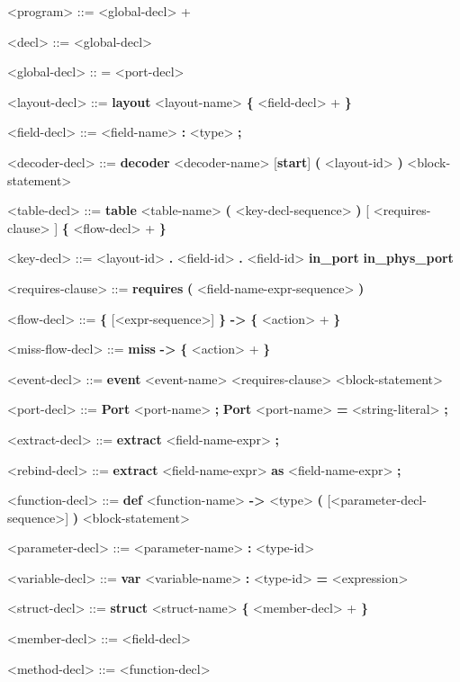 \begin{mdframed}
\begin{grammar}

<program> ::= <global-decl> +

<decl> ::=
<global-decl>

<global-decl> :: =
<port-decl>

<layout-decl> ::=
\textbf{layout} <layout-name> 
\textbf{\{}
	<field-decl> +
\textbf{\}}

<field-decl> ::=
<field-name> \textbf{:} <type> \textbf{;}

<decoder-decl> ::=
\textbf{decoder} <decoder-name> [\textbf{start}] 
\textbf{(} <layout-id> \textbf{)}
<block-statement>

<table-decl> ::=
\textbf{table} <table-name> \textbf{(} <key-decl-sequence> \textbf{)} 
[ <requires-clause> ]
\textbf{\{} 
<flow-decl> + 
\textbf{\}}

<key-decl> ::=
<layout-id> \textbf{.} <field-id>
 \textbf{.} <field-id>
\alt \textbf{in\_port}
\alt \textbf{in\_phys\_port}

<requires-clause> ::=
\textbf{requires} \textbf{(} <field-name-expr-sequence> \textbf{)}

<flow-decl> ::=
\textbf{\{} [<expr-sequence>] \textbf{\}} \textbf{-\textgreater}
\textbf{\{} 
<action> +
\textbf{\}}

<miss-flow-decl> ::=
\textbf{miss} \textbf{-\textgreater}
\textbf{\{} 
<action> +
\textbf{\}}

<event-decl> ::=
\textbf{event} <event-name> <requires-clause> 
<block-statement>

<port-decl> ::=
\textbf{Port} <port-name> \textbf{;}
\alt \textbf{Port} <port-name> \textbf{=} <string-literal> \textbf{;}

<extract-decl> ::=
\textbf{extract} <field-name-expr> \textbf{;}

<rebind-decl> ::=
\textbf{extract} <field-name-expr> \textbf{as} <field-name-expr> \textbf{;}

<function-decl> ::=
\textbf{def} <function-name> \textbf{-\textgreater} <type> 
\textbf{(} [<parameter-decl-sequence>] \textbf{)} <block-statement>

<parameter-decl> ::=
<parameter-name> \textbf{:} <type-id>

<variable-decl> ::=
\textbf{var} <variable-name> \textbf{:} <type-id> \textbf{=} <expression>

<struct-decl> ::=
\textbf{struct} <struct-name>
\textbf{\{}
	<member-decl> +
\textbf{\}}

<member-decl> ::=
<field-decl>

<method-decl> ::= <function-decl>


\end{grammar}
\end{mdframed}

